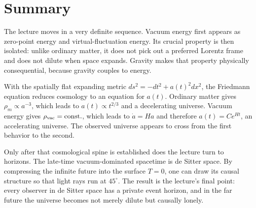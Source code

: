 \section{Summary}

The lecture moves in a very definite sequence. Vacuum energy first appears as zero-point energy and virtual-fluctuation energy. Its crucial property is then isolated: unlike ordinary matter, it does not pick out a preferred Lorentz frame and does not dilute when space expands. Gravity makes that property physically consequential, because gravity couples to energy.

With the spatially flat expanding metric \(ds^2=-dt^2+a(t)^2dx^2\), the Friedmann equation reduces cosmology to an equation for \(a(t)\). Ordinary matter gives \(\rho_m\propto a^{-3}\), which leads to \(a(t)\propto t^{2/3}\) and a decelerating universe. Vacuum energy gives \(\rho_{\rm vac}=\text{const.}\), which leads to \(\dot a=Ha\) and therefore \(a(t)=Ce^{Ht}\), an accelerating universe. The observed universe appears to cross from the first behavior to the second.

Only after that cosmological spine is established does the lecture turn to horizons. The late-time vacuum-dominated spacetime is de Sitter space. By compressing the infinite future into the surface \(T=0\), one can draw its causal structure so that light rays run at \(45^\circ\). The result is the lecture's final point: every observer in de Sitter space has a private event horizon, and in the far future the universe becomes not merely dilute but causally lonely.